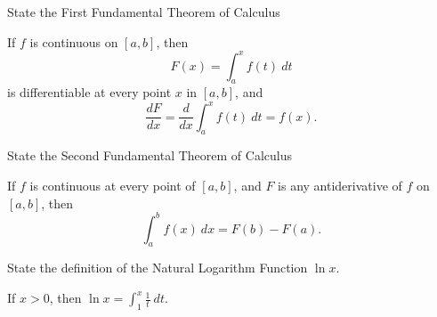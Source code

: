 \begin{questions}
    \question[1] State the First Fundamental Theorem of Calculus
    \begin{solution}
        \begin{theorem}
            If $f$ is continuous on $[a, b]$, then
            $$F(x) = \int_a^x f(t)\ dt$$
            is differentiable at every point $x$ in $[a, b]$, and
            $$\frac{dF}{dx} = \frac{d}{dx} \int_a^x f(t)\ dt = f(x).$$
        \end{theorem}
    \end{solution}

    \question[1] State the Second Fundamental Theorem of Calculus
    \begin{solution}
        \begin{theorem}
            If $f$ is continuous at every point of $[a, b]$, and $F$
            is any antiderivative of $f$ on $[a, b]$, then
            $$\int_a^b f(x)\ dx = F(b) - F(a).$$
        \end{theorem}
    \end{solution}

    \question[1] State the definition of the Natural Logarithm
    Function $\ln x$.
    \begin{solution}
        \begin{definition}
            If $x > 0$, then $\ln x = \int_1^x \frac{1}{t}\ dt.$
        \end{definition}
    \end{solution}
\end{questions}

